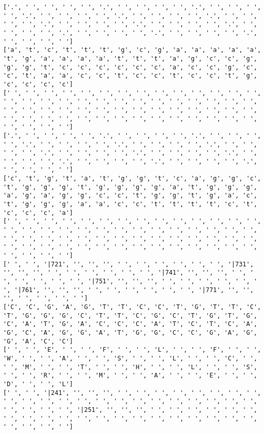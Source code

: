 \documentclass{article}
\begin{document}
\begin{Verbatim}
['.', ' ', ' ', ' ', ' ', '.', ' ', ' ', ' ', ' ', '.', ' ', ' ', ' ', ' ', '.', ' ', ' ', ' ', ' ', '.', ' ', ' ', ' ', ' ', '.', ' ', ' ', ' ', ' ', '.', ' ', ' ', ' ', ' ', '.', ' ', ' ', ' ', ' ', '.', ' ', ' ', ' ', ' ', '.', ' ', ' ', ' ', ' ', '.', ' ', ' ', ' ', ' ', '.', ' ', ' ', ' ', ' ']
['a', 't', 'c', 't', 't', 't', 'g', 'c', 'g', 'a', 'a', 'a', 'a', 'a', 't', 'g', 'a', 'a', 'a', 'a', 't', 't', 't', 'a', 'g', 'c', 'c', 'g', 'g', 'g', 't', 'c', 'c', 'c', 'c', 'c', 'c', 'a', 'c', 'c', 'g', 'c', 'c', 't', 'a', 'a', 'c', 'c', 't', 'c', 'c', 't', 'c', 'c', 't', 'g', 'c', 'c', 'c', 'c']
[' ', ' ', ' ', ' ', ' ', ' ', ' ', ' ', ' ', ' ', ' ', ' ', ' ', ' ', ' ', ' ', ' ', ' ', ' ', ' ', ' ', ' ', ' ', ' ', ' ', ' ', ' ', ' ', ' ', ' ', ' ', ' ', ' ', ' ', ' ', ' ', ' ', ' ', ' ', ' ', ' ', ' ', ' ', ' ', ' ', ' ', ' ', ' ', ' ', ' ', ' ', ' ', ' ', ' ', ' ', ' ', ' ', ' ', ' ', ' ']
['.', ' ', ' ', ' ', ' ', '.', ' ', ' ', ' ', ' ', '.', ' ', ' ', ' ', ' ', '.', ' ', ' ', ' ', ' ', '.', ' ', ' ', ' ', ' ', '.', ' ', ' ', ' ', ' ', '.', ' ', ' ', ' ', ' ', '.', ' ', ' ', ' ', ' ', '.', ' ', ' ', ' ', ' ', '.', ' ', ' ', ' ', ' ', '.', ' ', ' ', ' ', ' ', '.', ' ', ' ', ' ', ' ']
['c', 't', 'g', 't', 'a', 't', 'g', 'g', 't', 'c', 'a', 'g', 'g', 'c', 't', 'g', 'g', 'g', 't', 'g', 'g', 'g', 'g', 'a', 't', 'g', 'g', 'g', 'a', 'g', 'a', 'g', 'g', 'c', 'c', 't', 'g', 'g', 't', 'g', 'a', 'c', 't', 'g', 'g', 'g', 'a', 'a', 'c', 'c', 't', 't', 't', 't', 'c', 't', 'c', 'c', 'c', 'a']
[' ', ' ', ' ', ' ', ' ', ' ', ' ', ' ', ' ', ' ', ' ', ' ', ' ', ' ', ' ', ' ', ' ', ' ', ' ', ' ', ' ', ' ', ' ', ' ', ' ', ' ', ' ', ' ', ' ', ' ', ' ', ' ', ' ', ' ', ' ', ' ', ' ', ' ', ' ', ' ', ' ', ' ', ' ', ' ', ' ', ' ', ' ', ' ', ' ', ' ', ' ', ' ', ' ', ' ', ' ', ' ', ' ', ' ', ' ', ' ']
[' ', ' ', '|721', '', '', '', ' ', ' ', ' ', ' ', ' ', ' ', '|731', '', '', '', ' ', ' ', ' ', ' ', ' ', ' ', '|741', '', '', '', ' ', ' ', ' ', ' ', ' ', ' ', '|751', '', '', '', ' ', ' ', ' ', ' ', ' ', ' ', '|761', '', '', '', ' ', ' ', ' ', ' ', ' ', ' ', '|771', '', '', '', ' ', ' ', ' ', ' ']
['C', 'C', 'G', 'A', 'G', 'T', 'T', 'C', 'C', 'T', 'G', 'T', 'T', 'C', 'T', 'G', 'G', 'G', 'C', 'T', 'T', 'C', 'G', 'C', 'T', 'G', 'T', 'G', 'C', 'A', 'T', 'G', 'A', 'C', 'C', 'C', 'A', 'T', 'C', 'T', 'C', 'A', 'G', 'C', 'A', 'G', 'G', 'A', 'T', 'G', 'G', 'C', 'C', 'G', 'A', 'G', 'G', 'A', 'C', 'C']
[' ', ' ', 'E', ' ', ' ', 'F', ' ', ' ', 'L', ' ', ' ', 'F', ' ', ' ', 'W', ' ', ' ', 'A', ' ', ' ', 'S', ' ', ' ', 'L', ' ', ' ', 'C', ' ', ' ', 'M', ' ', ' ', 'T', ' ', ' ', 'H', ' ', ' ', 'L', ' ', ' ', 'S', ' ', ' ', 'R', ' ', ' ', 'M', ' ', ' ', 'A', ' ', ' ', 'E', ' ', ' ', 'D', ' ', ' ', 'L']
[' ', ' ', '|241', '', '', '', ' ', ' ', ' ', ' ', ' ', ' ', ' ', ' ', ' ', ' ', ' ', ' ', ' ', ' ', ' ', ' ', ' ', ' ', ' ', ' ', ' ', ' ', ' ', ' ', ' ', ' ', '|251', '', '', '', ' ', ' ', ' ', ' ', ' ', ' ', ' ', ' ', ' ', ' ', ' ', ' ', ' ', ' ', ' ', ' ', ' ', ' ', ' ', ' ', ' ', ' ', ' ', ' ']
  

\end{Verbatim}
\end{document}
